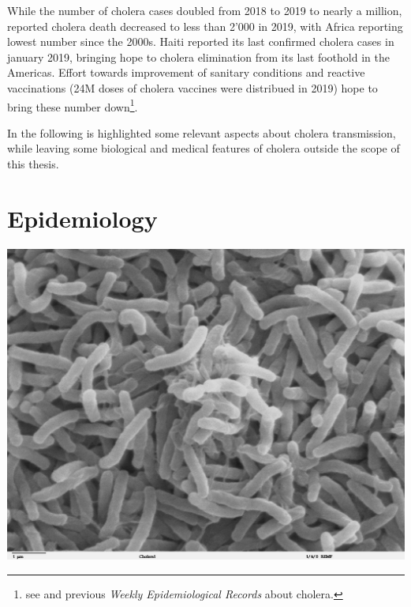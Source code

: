 While the number of cholera cases doubled from 2018 to 2019 to nearly a million, reported cholera death decreased to less than 2'000 in 2019, with Africa reporting lowest number since the 2000s. Haiti reported its last confirmed cholera cases in january 2019, bringing hope to cholera elimination from its last foothold in the Americas. Effort towards improvement of sanitary conditions and reactive vaccinations (24M doses of cholera vaccines were distribued in 2019) hope to bring these number down\footnote{see  and previous \textit{Weekly Epidemiological Records} about cholera.}. 

In the following is highlighted some relevant aspects about cholera transmission, while leaving some biological and medical features of cholera outside the scope of this thesis.


\section{Epidemiology} 
\begin{marginfigure}[6\baselineskip]
\centering
\includegraphics{fig/vibrio}
\label{fig:bacteria}
\end{marginfigure}
